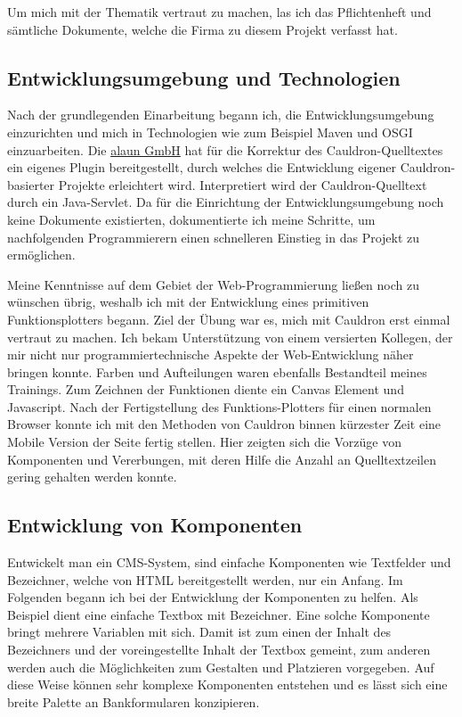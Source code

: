 \documentclass[12pt]{article}
\begin{document}
Um mich mit der Thematik vertraut zu machen, las ich das Pflichtenheft und sämtliche Dokumente, welche die Firma
zu diesem Projekt verfasst hat. 

\subsection{Entwicklungsumgebung und Technologien}

Nach der grundlegenden Einarbeitung begann ich, die Entwicklungsumgebung einzurichten und mich in Technologien
wie zum Beispiel Maven und OSGI einzuarbeiten. Die \href{https://alaun.de/home/}{alaun GmbH} hat für die Korrektur
des Cauldron-Quelltextes ein eigenes Plugin bereitgestellt, durch welches die Entwicklung eigener Cauldron-basierter
Projekte erleichtert wird. Interpretiert wird der Cauldron-Quelltext durch ein Java-Servlet. 
Da für die Einrichtung der Entwicklungsumgebung noch keine Dokumente existierten, dokumentierte ich meine Schritte,
um nachfolgenden Programmierern einen schnelleren Einstieg in das Projekt zu ermöglichen.

Meine Kenntnisse auf dem Gebiet der Web-Programmierung ließen noch zu wünschen übrig, weshalb ich mit der Entwicklung
eines primitiven Funktionsplotters begann. Ziel der Übung war es, mich mit Cauldron erst einmal vertraut zu machen.
Ich bekam Unterstützung von einem versierten Kollegen, der mir nicht nur programmiertechnische Aspekte der Web-Entwicklung näher bringen konnte.
Farben und Aufteilungen waren ebenfalls Bestandteil meines Trainings. 
Zum Zeichnen der Funktionen diente ein Canvas Element und Javascript.
Nach der Fertigstellung des Funktions-Plotters für einen normalen Browser konnte ich mit den Methoden von Cauldron
binnen kürzester Zeit eine Mobile Version der Seite fertig stellen.
Hier zeigten sich die Vorzüge von Komponenten und Vererbungen, mit deren Hilfe die Anzahl an Quelltextzeilen gering gehalten
werden konnte.

\subsection{Entwicklung von Komponenten}

Entwickelt man ein CMS-System, sind einfache Komponenten wie Textfelder und Bezeichner, welche von HTML bereitgestellt werden,
nur ein Anfang. Im Folgenden begann ich bei der Entwicklung der Komponenten zu helfen. Als Beispiel dient eine einfache Textbox
mit Bezeichner. Eine solche Komponente bringt mehrere Variablen mit sich. Damit ist zum einen der Inhalt des Bezeichners und der
voreingestellte Inhalt der Textbox gemeint, zum anderen werden auch die Möglichkeiten zum Gestalten und Platzieren vorgegeben.
Auf diese Weise können sehr komplexe Komponenten entstehen und es lässt sich eine breite Palette an Bankformularen konzipieren.
\end{document}

